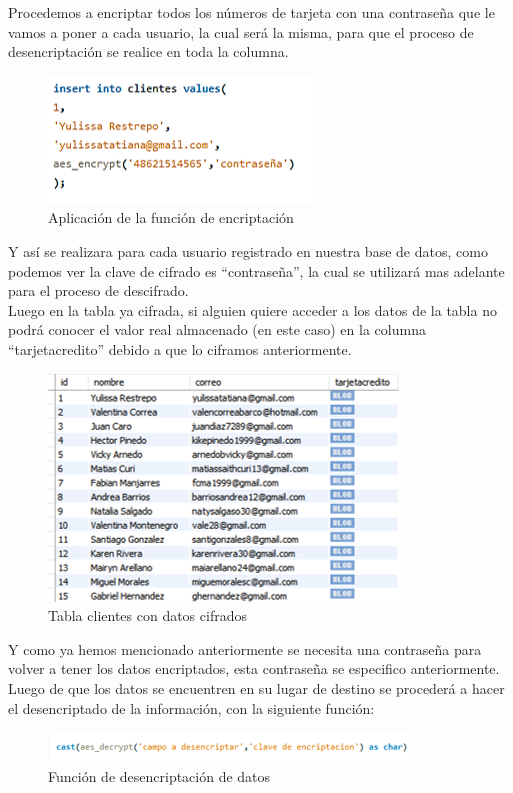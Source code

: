 \documentclass[9pt,24pt,twocolumn]{article}
\begin{document}
{Procedemos a encriptar todos los números de tarjeta con una contraseña que le vamos a poner a cada usuario, la cual será la misma, para que el proceso de desencriptación se realice en toda la columna.} 

\begin{figure}[h]
\begin{flushleft}
    \includegraphics{bas5}
\end{flushleft}
  \caption{Aplicación de la función de encriptación}
  \label{fig:5}
\end{figure}

{Y así se realizara para cada usuario registrado en nuestra base de datos, como podemos ver la clave de cifrado es “contraseña”, la cual se utilizará mas adelante para el proceso de descifrado.}
\\

{Luego en la tabla ya cifrada, si alguien quiere acceder a los datos de la tabla no podrá conocer el valor real almacenado (en este caso) en la columna “tarjetacredito” debido a que lo ciframos anteriormente.}

\begin{figure}[h]
\begin{flushleft}
    \includegraphics{bas6}
\end{flushleft}
  \caption{Tabla clientes con datos cifrados}
  \label{fig:6}
\end{figure}

{Y como ya hemos mencionado anteriormente se necesita una contraseña para volver a tener los datos encriptados, esta contraseña se especifico anteriormente. Luego de que los datos se encuentren en su lugar de destino se procederá a hacer el desencriptado de la información, con la siguiente función:}
\begin{figure}[h]
\begin{flushleft}
    \includegraphics{bas7}
      \caption{Función de desencriptación de datos}
  \label{fig:7}
\end{flushleft}
\end{figure}
\end{document}
